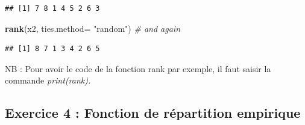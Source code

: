\documentclass[
  12pt,
]{article}
\newenvironment{Shaded}{\begin{snugshade}}{\end{snugshade}}
\newcommand{\AttributeTok}[1]{\textcolor[rgb]{0.13,0.29,0.53}{#1}}
\newcommand{\CommentTok}[1]{\textcolor[rgb]{0.56,0.35,0.01}{\textit{#1}}}
\newcommand{\FunctionTok}[1]{\textcolor[rgb]{0.13,0.29,0.53}{\textbf{#1}}}
\newcommand{\NormalTok}[1]{#1}
\newcommand{\StringTok}[1]{\textcolor[rgb]{0.31,0.60,0.02}{#1}}
\begin{document}
\begin{verbatim}
## [1] 7 8 1 4 5 2 6 3
\end{verbatim}

\begin{Shaded}
\begin{Highlighting}[]
\FunctionTok{rank}\NormalTok{(x2, }\AttributeTok{ties.method=} \StringTok{"random"}\NormalTok{) }\CommentTok{\# and again}
\end{Highlighting}
\end{Shaded}

\begin{verbatim}
## [1] 8 7 1 3 4 2 6 5
\end{verbatim}

NB : Pour avoir le code de la fonction rank par exemple, il faut saisir
la commande \emph{print(rank).}

\subsection{Exercice 4 : Fonction de répartition
empirique}\label{exercice-4-fonction-de-ruxe9partition-empirique}
\end{document}
